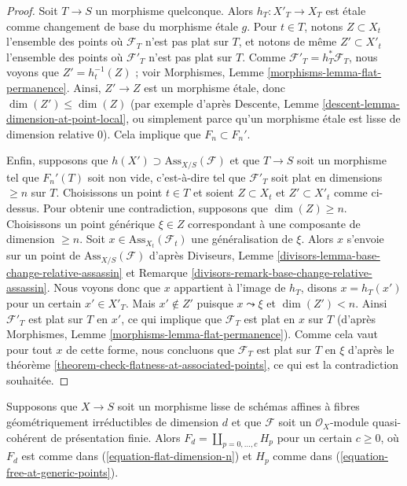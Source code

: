 \begin{proof}
Soit $T \to S$ un morphisme quelconque. Alors $h_T : X'_T \to X_T$ est \'etale comme
changement de base du morphisme \'etale $g$. Pour $t \in T$, notons
$Z \subset X_t$ l'ensemble des points où $\mathcal{F}_T$ n'est pas
plat sur $T$, et notons de même $Z' \subset X'_t$ l'ensemble des
points où $\mathcal{F}'_T$ n'est pas plat sur $T$. Comme
$\mathcal{F}'_T = h_T^*\mathcal{F}_T$, nous voyons que
$Z' = h_t^{-1}(Z)$ ; voir
Morphismes, Lemme \ref{morphisms-lemma-flat-permanence}.
Ainsi, $Z' \to Z$ est un morphisme \'etale, donc $\dim(Z') \leq \dim(Z)$
(par exemple d'après
Descente, Lemme \ref{descent-lemma-dimension-at-point-local},
ou simplement parce qu'un morphisme \'etale est lisse de dimension relative $0$).
Cela implique que $F_n \subset F_n'$.

\medskip\noindent
Enfin, supposons que $h(X') \supset \text{Ass}_{X/S}(\mathcal{F})$
et que $T \to S$ soit un morphisme tel que $F_n'(T)$ soit non vide, c'est-à-dire
tel que $\mathcal{F}'_T$ soit plat en dimensions $\geq n$ sur $T$.
Choisissons un point $t \in T$ et soient $Z \subset X_t$ et $Z' \subset X'_t$
comme ci-dessus. Pour obtenir une contradiction, supposons que $\dim(Z) \geq n$.
Choisissons un point générique $\xi \in Z$ correspondant à une composante
de dimension $\geq n$. Soit $x \in \text{Ass}_{X_t}(\mathcal{F}_t)$
une généralisation de $\xi$. Alors $x$ s'envoie sur un point de
$\text{Ass}_{X/S}(\mathcal{F})$ d'après
Diviseurs, Lemme \ref{divisors-lemma-base-change-relative-assassin} et
Remarque \ref{divisors-remark-base-change-relative-assassin}.
Nous voyons donc que $x$ appartient à l'image de $h_T$, disons
$x = h_T(x')$ pour un certain $x' \in X'_T$. Mais $x' \not \in Z'$
puisque $x \leadsto \xi$ et $\dim(Z') < n$. Ainsi $\mathcal{F}'_T$
est plat sur $T$ en $x'$, ce qui implique que $\mathcal{F}_T$ est plat
en $x$ sur $T$ (d'après
Morphismes, Lemme \ref{morphisms-lemma-flat-permanence}).
Comme cela vaut pour tout $x$ de cette forme, nous concluons
que $\mathcal{F}_T$ est plat sur $T$ en $\xi$ d'après le
théorème \ref{theorem-check-flatness-at-associated-points},
ce qui est la contradiction souhaitée.
\end{proof}

\begin{lemma}
\label{lemma-compare-H-F}
Supposons que $X \to S$ soit un morphisme lisse de schémas affines
à fibres géométriquement irréductibles de dimension $d$ et que
$\mathcal{F}$ soit un $\mathcal{O}_X$-module quasi-cohérent de
présentation finie. Alors $F_d = \coprod_{p = 0, \ldots, c} H_p$
pour un certain $c \geq 0$, où $F_d$ est comme dans
(\ref{equation-flat-dimension-n}) et $H_p$ comme dans
(\ref{equation-free-at-generic-points}).
\end{lemma}

